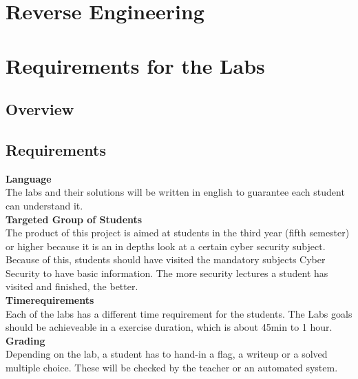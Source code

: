 \section{Reverse Engineering}
\section{Requirements for the Labs}
\subsection{Overview}
\subsection{Requirements}
\textbf{Language} \\
The labs and their solutions will be written in english to guarantee each student can understand it. \\[0.5cm]
\textbf{Targeted Group of Students} \\
The product of this project is aimed at students in the third year (fifth semester) or higher because it is an in depths look at a certain cyber security subject. Because of this, students should have visited the mandatory subjects Cyber Security to have basic information. The more security lectures a student has visited and finished, the better. \\[0.5cm]
\textbf{Timerequirements} \\
Each of the labs has a different time requirement for the students. The Labs goals should be achieveable in a exercise duration, which is about 45min to 1 hour. \\[0.5cm]
\textbf{Grading} \\
Depending on the lab, a student has to hand-in a flag, a writeup or a solved multiple choice. These will be checked by the teacher or an automated system. \\[0.5cm]
